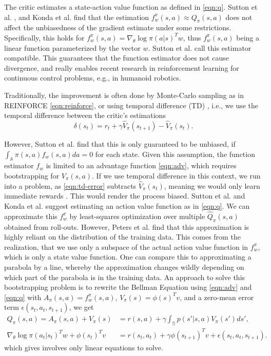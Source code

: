 The critic estimates a state-action value function as defined in \eqref{eqn:q}. 
Sutton et al. \cite{Sutton:1999:PGM:3009657.3009806}, and Konda et al. \cite{Konda:2003:AA:942271.942292} find that the estimation $f_w^\pi(s,a) \approx Q_\pi(s,a)$ does not affect the unbiasedness of the gradient estimate under some restrictions. 
Specifically, this holds for $f_w^\pi(s,a) = {\nabla_\theta \log\pi(a|s)}^T w$, thus $f_w^\pi(s,a)$ being a linear function parameterized by the vector $w$.
Sutton et al. \cite{Sutton:1999:PGM:3009657.3009806} call this estimator compatible.
This guarantees that the function estimator does not cause divergence, and really enables recent research in reinforcement learning for continuous control problems, e.g., in humanoid robotics.

Traditionally, the improvement is often done by Monte-Carlo sampling as in REINFORCE \eqref{eqn:reinforce}, or using temporal difference (TD) \cite{Sutton1988}, i.e., we use the temporal difference between the critic's estimations 
\begin{equation}
  \delta(s_t) = r_t + \gamma \hat{V}_\pi(s_{t+1}) - \hat{V}_\pi(s_t).
  \label{eqn:td-error}
\end{equation}

However, Sutton et al. \cite{1993b} find that this is only guaranteed to be unbiased, if $\int_\mathbb{A}{\pi(s,a)f_w(s,a)da} = 0$ for each state. 
Given this assumption, the function estimator $f_w$ is limited to an advantage function \eqref{eqn:adv}, which requires bootstrapping for $V_\pi(s,a)$. 
If we use temporal difference in this context, we run into a problem, as \eqref{eqn:td-error} subtracts $\hat{V}_\pi(s_t)$, meaning we would only learn immediate rewards \cite{Peters_IICHR_2003}. 
This would render the process biased. 
Sutton et al. \cite{Sutton:1999:PGM:3009657.3009806} and Konda et al. \cite{NIPS1999_1786} suggest estimating an action value function as in \eqref{eqn:q}. 
We can approximate this $f_w^\pi$ by least-squares optimization over multiple $\hat{Q}_\pi(s,a)$ obtained from roll-outs. 
However, Peters et al. \cite{4863} find that this approximation is highly reliant on the distribution of the training data. 
This comes from the realization, that we use only a subspace of the actual action value function in $f_w^\pi$, which is only a state value function. 
One can compare this to approximating a parabola by a line, whereby the approximation changes wildly depending on which part of the parabola is in the training data. 
An approach to solve this bootstrapping problem is to rewrite the Bellman Equation using \eqref{eqn:adv} and \eqref{eqn:q} with $A_\pi(s,a) = f_w^\pi(s,a)$, $V_\pi(s) = \phi(s)^T v$, and a zero-mean error term $\epsilon(s_t,a_t,s_{t+1})$, we get
\begin{align}
  Q_\pi(s,a) = A_\pi(s,a) + V_\pi(s) &= r(s,a) + \gamma \int_\mathbb{S} p(s'|s,a)V_\pi(s')ds', \\
  \nabla_\theta \log \pi(a_t|s_t)^T w + \phi(s_t)^T v &= r(s_t,a_t) + \gamma \phi(s_{t+1})^T v + \epsilon(s_t,a_t,s_{t+1}).
\end{align}
which gives involves only linear equations to solve. \cite{4863} 

